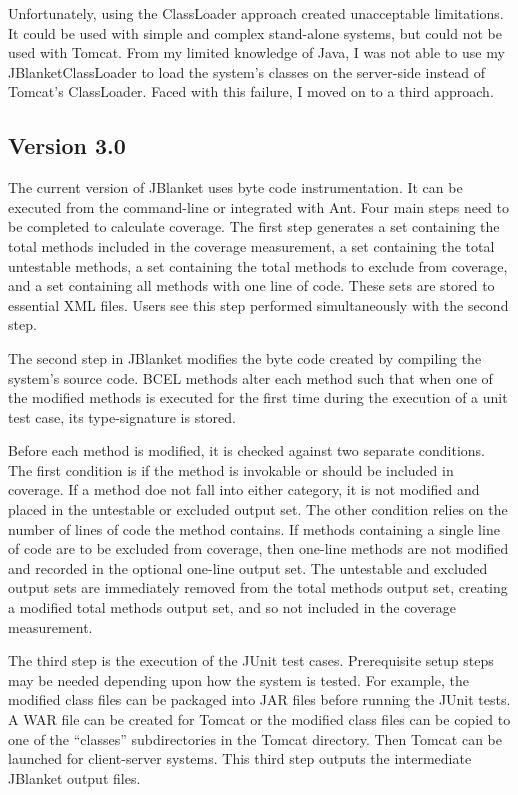 Unfortunately, using the ClassLoader approach created unacceptable
limitations.  It could be used with simple and complex stand-alone systems,
but could not be used with Tomcat.  From my limited knowledge of Java, I
was not able to use my JBlanketClassLoader to load the system's classes on
the server-side instead of Tomcat's ClassLoader.  Faced with this failure,
I moved on to a third approach.

\subsection{Version 3.0}
The current version of JBlanket uses byte code instrumentation.  It can be
executed from the command-line or integrated with Ant.  Four main steps
need to be completed to calculate coverage.  The first step generates a set
containing the total methods included in the coverage measurement, a set
containing the total untestable methods, a set containing the total methods
to exclude from coverage, and a set containing all methods with one line of
code.  These sets are stored to essential XML files.  Users see this step
performed simultaneously with the second step.

The second step in JBlanket modifies the byte code created by compiling the
system's source code. BCEL methods alter each method such that when one of
the modified methods is executed for the first time during the execution of
a unit test case, its type-signature is stored.

Before each method is modified, it is checked against two separate
conditions.  The first condition is if the method is invokable or should be
included in coverage.  If a method doe not fall into either category, it is
not modified and placed in the untestable or excluded output set.  The
other condition relies on the number of lines of code the method contains.
If methods containing a single line of code are to be excluded from
coverage, then one-line methods are not modified and recorded in the
optional one-line output set.  The untestable and excluded output sets are
immediately removed from the total methods output set, creating a modified
total methods output set, and so not included in the coverage measurement.

The third step is the execution of the JUnit test cases.  Prerequisite
setup steps may be needed depending upon how the system is tested.  For
example, the modified class files can be packaged into JAR files before
running the JUnit tests.  A WAR file can be created for Tomcat or the
modified class files can be copied to one of the ``classes'' subdirectories
in the Tomcat directory.  Then Tomcat can be launched for client-server
systems.  This third step outputs the intermediate JBlanket output files.

